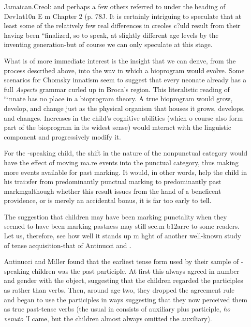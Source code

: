 Jamaican.Creol: and perhaps a few others referred to under the heading of Dev1at10n E m Chapter 2 (p. 78J. It is certainly intriguing to speculate that at least some of the relatively few real differences in creoles c?uld result from their having been ``finalized, so to speak, at slightly
different age levels by the inventing generation-but of course we can only speculate at this stage.

What is of more immediate interest is the insight that we can denve, from the process described above, into the wav in which a bio\-program would evolve. Some scenarios for Chomsky innatism seem to suggest that every neonate already has a full \textit{Aspects} grammar curled
up in Broca's region. This literalistic reading of ``innate has no place in a bioprogram theory. A true bioprogram would grow, develop, and change just as the physical organism that houses it grows, develops, and changes. Increases in the child's cognitive abilities (which o course also form part of the bioprogram in its widest sense) would mteract with the linguistic component and progressively modify it.

For the -speaking child, the shift in the nature of the
nonpunctual category would have the effect of moving ma.re events into the punctual category, thus making more events available for past marking. It would, in other words, help the child in his trai:sfer from predominantly punctual marking to predominantly past markmg\-although whether this result issues from the hand of a beneficent providence, or is merely an accidental bonus, it is far too early to tell.

The suggestion that children may have been marking punctality when they seemed to have been marking pastness may still see.m b12arre to some readers. Let us, therefore, see how well it stands up m hght of another well-known study of tense acquisition-that of Antinucci and
\citet{Miller1976}.

Antinucci and Miller found that the earliest tense form used by
their sample of -speaking children was the past participle. At first this always agreed in number and gender with the  object, suggesting that the children regarded the participles as  rather than verbs. Then, around age two, they dropped the agreement rule and began to use the participles in ways suggesting that they now perceived them as true past-tense verbs (the usual  in  consists of auxiliary plus participle, \textit{ho venuto }'I came, but the children almost always omitted the auxiliary).

